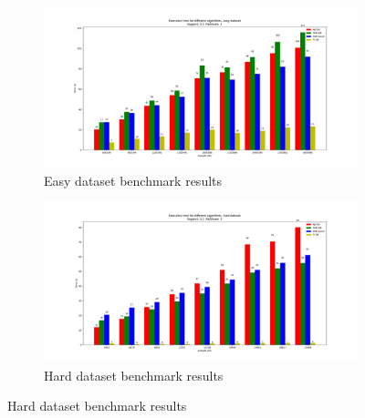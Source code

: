 \documentclass[a4paper]{article}
\begin{document}
	\begin{figure}[h]
		\centering
		\begin{subfigure}[b]{0.45\textwidth}
			\centering
			\includegraphics[width=\textwidth]{1_easy_0,3_2_dataset.png}
         	\caption{Easy dataset benchmark results}
         	\label{fig:1-03sup-2par-ds-e}
		\end{subfigure}
		\hfill		
		\begin{subfigure}[b]{0.45\textwidth}
			\centering
			\includegraphics[width=\textwidth]{1_hard_0,1_2_dataset.png}
         	\caption{Hard dataset benchmark results}
         	\label{fig:1-01sup-2par-ds-h}
		\end{subfigure}
		\hfill
		
	\end{figure}
	
	
	
\end{document}
